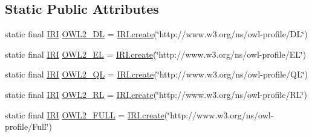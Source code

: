 \subsection*{Static Public Attributes}
\begin{DoxyCompactItemize}
\item 
static final \hyperlink{classorg_1_1semanticweb_1_1owlapi_1_1model_1_1_i_r_i}{I\-R\-I} \hyperlink{interfaceorg_1_1semanticweb_1_1owlapi_1_1profiles_1_1_o_w_l_profile_a8b11c12838a73dafacbed5a990556e96}{O\-W\-L2\-\_\-\-D\-L} = \hyperlink{classorg_1_1semanticweb_1_1owlapi_1_1model_1_1_i_r_i_a689f56b17fd566c81d3d654efd7bfe0d}{I\-R\-I.\-create}(\char`\"{}http\-://www.\-w3.\-org/ns/owl-\/profile/D\-L\char`\"{})
\item 
static final \hyperlink{classorg_1_1semanticweb_1_1owlapi_1_1model_1_1_i_r_i}{I\-R\-I} \hyperlink{interfaceorg_1_1semanticweb_1_1owlapi_1_1profiles_1_1_o_w_l_profile_add82ed6f03a718a795c66c9e04b282be}{O\-W\-L2\-\_\-\-E\-L} = \hyperlink{classorg_1_1semanticweb_1_1owlapi_1_1model_1_1_i_r_i_a689f56b17fd566c81d3d654efd7bfe0d}{I\-R\-I.\-create}(\char`\"{}http\-://www.\-w3.\-org/ns/owl-\/profile/E\-L\char`\"{})
\item 
static final \hyperlink{classorg_1_1semanticweb_1_1owlapi_1_1model_1_1_i_r_i}{I\-R\-I} \hyperlink{interfaceorg_1_1semanticweb_1_1owlapi_1_1profiles_1_1_o_w_l_profile_a67484a6098fe77e4b9852b1895a4547b}{O\-W\-L2\-\_\-\-Q\-L} = \hyperlink{classorg_1_1semanticweb_1_1owlapi_1_1model_1_1_i_r_i_a689f56b17fd566c81d3d654efd7bfe0d}{I\-R\-I.\-create}(\char`\"{}http\-://www.\-w3.\-org/ns/owl-\/profile/Q\-L\char`\"{})
\item 
static final \hyperlink{classorg_1_1semanticweb_1_1owlapi_1_1model_1_1_i_r_i}{I\-R\-I} \hyperlink{interfaceorg_1_1semanticweb_1_1owlapi_1_1profiles_1_1_o_w_l_profile_a6b820d98ca83c28b0a934868b9409390}{O\-W\-L2\-\_\-\-R\-L} = \hyperlink{classorg_1_1semanticweb_1_1owlapi_1_1model_1_1_i_r_i_a689f56b17fd566c81d3d654efd7bfe0d}{I\-R\-I.\-create}(\char`\"{}http\-://www.\-w3.\-org/ns/owl-\/profile/R\-L\char`\"{})
\item 
static final \hyperlink{classorg_1_1semanticweb_1_1owlapi_1_1model_1_1_i_r_i}{I\-R\-I} \hyperlink{interfaceorg_1_1semanticweb_1_1owlapi_1_1profiles_1_1_o_w_l_profile_a6b3c30696598241b6f748a425bb5c78b}{O\-W\-L2\-\_\-\-F\-U\-L\-L} = \hyperlink{classorg_1_1semanticweb_1_1owlapi_1_1model_1_1_i_r_i_a689f56b17fd566c81d3d654efd7bfe0d}{I\-R\-I.\-create}(\char`\"{}http\-://www.\-w3.\-org/ns/owl-\/profile/Full\char`\"{})
\end{DoxyCompactItemize}


